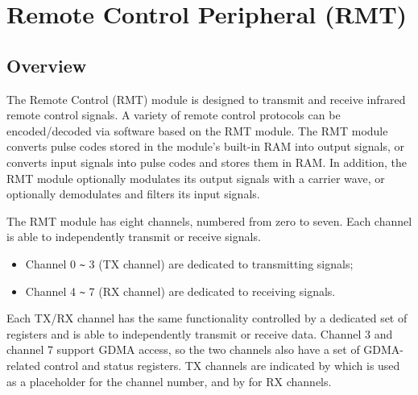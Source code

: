 \documentclass[main\_\_EN.tex]{subfiles}
\begin{document}

\ifglobal
\else
    {\let\clearpage\relax \listoftodos}
    {\let\clearpage\relax \listofdonetodos}
    \tableofcontents
\fi



\hypertarget{rmt}{}
\chapter{Remote Control Peripheral (RMT)}
\label{mod:rmt}


\section{Overview}

The Remote Control (RMT) module is designed to transmit and receive infrared remote control signals. A variety of remote control protocols can be encoded/decoded via software based on the RMT module. The RMT module converts pulse codes stored in the module's built-in RAM into output signals, or converts input signals into pulse codes and stores them in RAM. In addition, the RMT module optionally modulates its output signals with a carrier wave, or optionally demodulates and filters its input signals.

The RMT module has eight channels, numbered from zero to seven. Each channel is able to independently transmit or receive signals.
\begin{itemize}
    \item Channel 0 \verb+~+ 3 (TX channel) are dedicated to transmitting signals;
    \item Channel 4 \verb+~+ 7 (RX channel) are dedicated to receiving signals.
\end{itemize}

Each TX/RX channel has the same functionality controlled by a dedicated set of registers and is able to independently transmit or receive data. Channel 3 and channel 7 support GDMA access, so the two channels also have a set of GDMA-related control and status registers. TX channels are indicated by  which is used as a placeholder for the channel number, and by  for RX channels.
\end{document}
